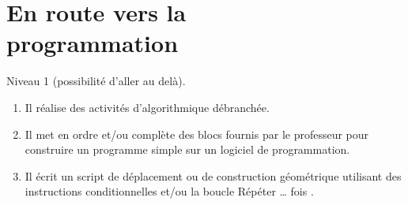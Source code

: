 \themaA
\graphicspath{{../../S03_En_route_vers_la_programmation/Images/}}

\newcommand{\cn}{\psframe[fillstyle=solid,fillcolor=black](0,0)(1,1)}
\newcommand{\ho}{\texttt{[image: Hercule]}}
\newcommand{\po}{\texttt{[image: pommier]}}

\newcommand{\dep}{\pspolygon[fillstyle=solid,fillcolor=orange](6,1)(0,1)(0,0)(1,0)(1.25,-0.25)(1.5,0)(6.5,0)(6.5,0.5) \pswedge[fillstyle=solid,fillcolor=orange,linecolor=orange](6,0.5){0.5}{0}{90} \psarc(6,0.5){0.5}{0}{90} \put(0.5,0.3){\footnotesize Démarre}}
\newcommand{\av}[1]{\pspolygon[fillstyle=solid,fillcolor=green](0,0)(1,0)(1.25,-0.25)(1.5,0)(6.5,0)(6.5,1)(1.5,1)(1.25,0.75)(1,1)(0,1) \put(0.5,0.3){\footnotesize Avance de #1}}
\newcommand{\tg}{\pspolygon[fillstyle=solid,fillcolor=yellow](0,0)(1,0)(1.25,-0.25)(1.5,0)(6.5,0)(6.5,1)(1.5,1)(1.25,0.75)(1,1)(0,1) \put(0.5,0.3){\footnotesize Tourne à gauche}}
\newcommand{\td}{\pspolygon[fillstyle=solid,fillcolor=pink](0,0)(1,0)(1.25,-0.25)(1.5,0)(6.5,0)(6.5,1)(1.5,1)(1.25,0.75)(1,1)(0,1) \put(0.5,0.3){\footnotesize Tourne à droite}}
\newcommand{\fin}{\pspolygon[fillstyle=solid,fillcolor=orange](0,0)(6,0)(6.5,0.5)(6.5,1)(1.5,1)(1.25,0.75)(1,1)(0,1)(0,0) \pswedge[fillstyle=solid,fillcolor=orange,linecolor=orange](6,0.5){0.5}{-90}{0} \psarc(6,0.5){0.5}{-90}{0} \put(0.5,0.3){\footnotesize Prends les pommes}}

\newcommand{\fourmi}[3]{\rput{#3}(#1,#2){\psdot[linecolor=red,dotstyle=triangle*,linewidth=1mm](0,0)}}
\newcommand{\cub}{\psframe[fillstyle=solid,fillcolor=black](0,0)(1,1)}

\chapter{En route vers la\\programmation}
\label{S03}


\begin{autoeval}
   \small
   Niveau 1 (possibilité d'aller au delà).
   \begin{enumerate}
      \item Il réalise des activités d’algorithmique débranchée.
      \item Il met en ordre et/ou complète des blocs fournis par le professeur pour construire un programme simple sur un logiciel de programmation.
      \item Il écrit un script de déplacement ou de construction géométrique utilisant des instructions conditionnelles et/ou la boucle \og Répéter \dots{} fois \fg.
   \end{enumerate}
\end{autoeval}

